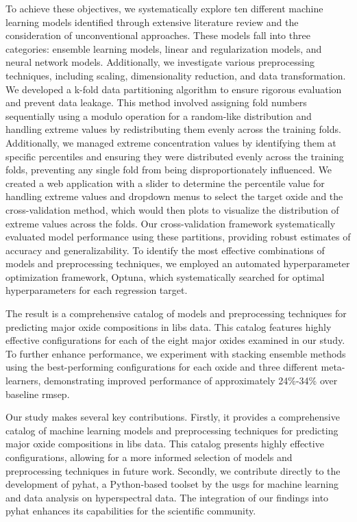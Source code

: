 \vspace{0.5em}

To achieve these objectives, we systematically explore ten different machine learning models identified through extensive literature review and the consideration of unconventional approaches.
These models fall into three categories: ensemble learning models, linear and regularization models, and neural network models.
Additionally, we investigate various preprocessing techniques, including scaling, dimensionality reduction, and data transformation.
We developed a k-fold data partitioning algorithm to ensure rigorous evaluation and prevent data leakage.
This method involved assigning fold numbers sequentially using a modulo operation for a random-like distribution and handling extreme values by redistributing them evenly across the training folds.
Additionally, we managed extreme concentration values by identifying them at specific percentiles and ensuring they were distributed evenly across the training folds, preventing any single fold from being disproportionately influenced.
We created a web application with a slider to determine the percentile value for handling extreme values and dropdown menus to select the target oxide and the cross-validation method, which would then plots to visualize the distribution of extreme values across the folds.
Our cross-validation framework systematically evaluated model performance using these partitions, providing robust estimates of accuracy and generalizability.
To identify the most effective combinations of models and preprocessing techniques, we employed an automated hyperparameter optimization framework, Optuna, which systematically searched for optimal hyperparameters for each regression target.

\vspace{0.5em}

The result is a comprehensive catalog of models and preprocessing techniques for predicting major oxide compositions in \gls{libs} data.
This catalog features highly effective configurations for each of the eight major oxides examined in our study.
To further enhance performance, we experiment with stacking ensemble methods using the best-performing configurations for each oxide and three different meta-learners, demonstrating improved performance of approximately 24\%-34\% over baseline \gls{rmsep}.

\vspace{0.5em}

Our study makes several key contributions.
Firstly, it provides a comprehensive catalog of machine learning models and preprocessing techniques for predicting major oxide compositions in \gls{libs} data.
This catalog presents highly effective configurations, allowing for a more informed selection of models and preprocessing techniques in future work.
Secondly, we contribute directly to the development of \gls{pyhat}, a Python-based toolset by the \gls{usgs} for machine learning and data analysis on hyperspectral data.
The integration of our findings into \gls{pyhat} enhances its capabilities for the scientific community.

